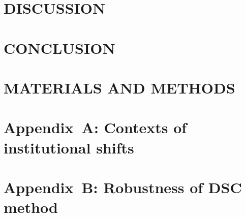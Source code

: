 \documentclass[default, sn-standardnature]{sn-jnl}
\begin{document}
\section{DISCUSSION}\label{sec:discussion}


\section{CONCLUSION}\label{sec:conclusion}


\section{MATERIALS AND METHODS}\label{sec:methods}






\label{bib}

\newpage
\appendix
\label{appendix}
\renewcommand{\figurename}{Supplementary Figure}
\renewcommand{\appendixname}{Appendix~\Alph{section}}
\setcounter{section}{0}

\section{Appendix~A: Contexts of institutional shifts}\label{secS1}
\renewcommand{\thefigure}{A\arabic{figure}}
\renewcommand{\thetable}{A\arabic{table}}
\setcounter{figure}{0}
\setcounter{table}{0}


\section{Appendix~B: Robustness of DSC method}\label{secS2}
\renewcommand{\thefigure}{B\arabic{figure}}
\renewcommand{\thetable}{B\arabic{table}}
\setcounter{figure}{0}
\setcounter{table}{0}


% 
\end{document}
